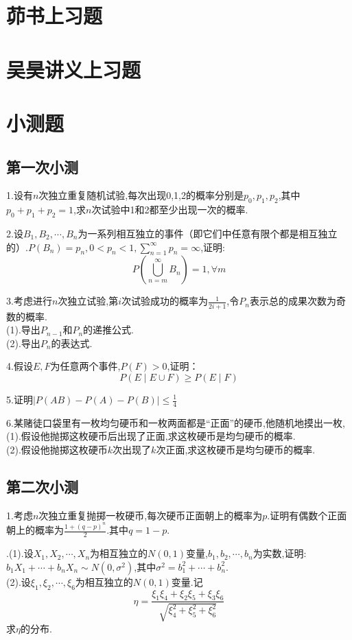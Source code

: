 \documentclass[lang=cn,10pt]{elegantbook}
\begin{document}
\chapter{茆书上习题}
\chapter{吴昊讲义上习题}
\chapter{小测题}
\section{第一次小测}
\noindent 1.设有$n$次独立重复随机试验,每次出现0,1,2的概率分别是$p_0,p_1,p_2$,其中$p_0+p_1+p_2=1$,求$n$次试验中1和2都至少出现一次的概率.

\noindent 2.设$B_1,B_2,\cdots,B_n$为一系列相互独立的事件（即它们中任意有限个都是相互独立的）.$P(B_n)=p_n,0<p_n<1,\sum_{n=1}^{\infty}p_n=\infty$,证明:
$$P\left(\bigcup_{n=m}^\infty B_n\right)=1,\forall m$$

\noindent 3.考虑进行$n$次独立试验,第$i$次试验成功的概率为$\frac{1}{2i+1}$,令$P_n$表示总的成果次数为奇数的概率.\\
(1).导出$P_{n-1}$和$P_n$的递推公式.\\
(2).导出$P_n$的表达式.

\noindent 4.假设$E,F$为任意两个事件,$P(F)>0$,证明：
$$P(E\mid E\cup F)\geq P(E\mid F)$$

\noindent 5.证明$\left|P(AB)-P(A)-P(B)\right|\leq\frac{1}{4}$

\noindent 6.某赌徒口袋里有一枚均匀硬币和一枚两面都是“正面”的硬币,他随机地摸出一枚,\\
(1).假设他抛掷这枚硬币后出现了正面,求这枚硬币是均匀硬币的概率.\\
(2).假设他抛掷这枚硬币$k$次出现了$k$次正面,求这枚硬币是均匀硬币的概率.
\newpage
\section{第二次小测}
\noindent 1.考虑$n$次独立重复抛掷一枚硬币,每次硬币正面朝上的概率为$p$.证明有偶数个正面朝上的概率为$\frac{1+(q-p)^n}{2}$.其中$q=1-p$.

.(1).设$X_1,X_2,\cdots,X_n$为相互独立的$N(0,1)$变量,$b_1,b_2,\cdots,b_n$为实数,证明:$b_1X_1+\cdots+b_nX_n\sim N(0,\sigma^2)$,其中$\sigma^2=b_1^2+\cdots+b_n^2$.\\
(2).设$\xi_1,\xi_2,\cdots,\xi_6$为相互独立的$N(0,1)$变量.记
$$\eta=\frac{\xi_1\xi_4+\xi_2\xi_5+\xi_3\xi_6}{\sqrt{\xi^2_4+\xi_5^2+\xi_6^2}}$$
求$\eta$的分布.
\end{document}
